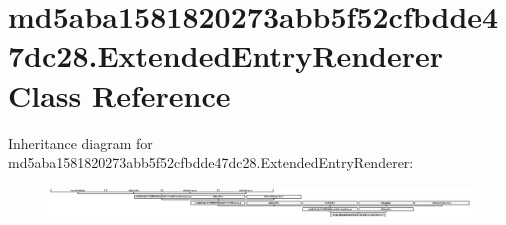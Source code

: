 \hypertarget{classmd5aba1581820273abb5f52cfbdde47dc28_1_1ExtendedEntryRenderer}{}\section{md5aba1581820273abb5f52cfbdde47dc28.\+Extended\+Entry\+Renderer Class Reference}
\label{classmd5aba1581820273abb5f52cfbdde47dc28_1_1ExtendedEntryRenderer}
Inheritance diagram for md5aba1581820273abb5f52cfbdde47dc28.\+Extended\+Entry\+Renderer\+:\begin{figure}[H]
\begin{center}
\leavevmode
\includegraphics[height=0.857843cm]{classmd5aba1581820273abb5f52cfbdde47dc28_1_1ExtendedEntryRenderer}
\end{center}
\end{figure}
